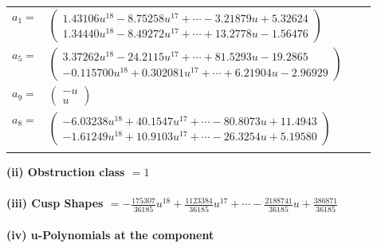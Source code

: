 \documentclass[1p]{elsarticle_modified}
\theoremstyle{definition}
\begin{document}
\begin{tabular}{m{7pt} m{180pt} m{7pt} m{180pt} }
\flushright $a_{1}=$&$\begin{pmatrix}1.43106 u^{18}-8.75258 u^{17}+\cdots-3.21879 u+5.32624\\1.34440 u^{18}-8.49272 u^{17}+\cdots+13.2778 u-1.56476\end{pmatrix}$ \\
\flushright $a_{5}=$&$\begin{pmatrix}3.37262 u^{18}-24.2115 u^{17}+\cdots+81.5293 u-19.2865\\-0.115700 u^{18}+0.302081 u^{17}+\cdots+6.21904 u-2.96929\end{pmatrix}$ \\
\flushright $a_{9}=$&$\begin{pmatrix}- u\\u\end{pmatrix}$ \\
\flushright $a_{8}=$&$\begin{pmatrix}-6.03238 u^{18}+40.1547 u^{17}+\cdots-80.8073 u+11.4943\\-1.61249 u^{18}+10.9103 u^{17}+\cdots-26.3254 u+5.19580\end{pmatrix}$\\&\end{tabular}
\flushleft \textbf{(ii) Obstruction class $= 1$}\\~\\
\flushleft \textbf{(iii) Cusp Shapes $= -\frac{175307}{36185} u^{18}+\frac{1123384}{36185} u^{17}+\cdots-\frac{2188741}{36185} u+\frac{386871}{36185}$}\\~\\
\newpage\renewcommand{\arraystretch}{1}
\flushleft \textbf{(iv) u-Polynomials at the component}\newline \\
\end{document}
